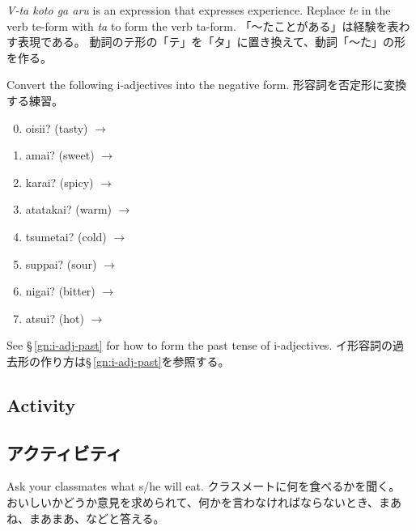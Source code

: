 \documentclass[uplatex,dvipdfmx,b5paper,english,10pt]{jsbook}
\begin{document}
\begin{toianswer}
\ifEnglish
{\it V-ta koto ga aru\/} is an expression that expresses experience.
Replace {\it te\/} in the verb te-form with {\it ta\/} to form the verb ta-form.
\else
「～たことがある」は経験を表わす表現である。
動詞のテ形の「テ」を「タ」に置き換えて、動詞「～た」の形を作る。
\fi
\end{toianswer}

\begin{toiquestion}
\ifEnglish
Convert the following i-adjectives into the negative form.
\else
形容詞を否定形に変換する練習。
\fi
\end{toiquestion}

\begin{multicols}{2}
 \begin{enumerate}
  \setcounter{enumi}{-1}
  \item oisii? (tasty)   $\rightarrow$ \hrulefill
  \item amai? (sweet)    $\rightarrow$ \hrulefill
  \item karai? (spicy)   $\rightarrow$ \hrulefill
  \item atatakai? (warm) $\rightarrow$ \hrulefill
  \item tsumetai? (cold) $\rightarrow$ \hrulefill
  \item suppai? (sour)   $\rightarrow$ \hrulefill
  \item nigai? (bitter)  $\rightarrow$ \hrulefill
  \item atsui? (hot)     $\rightarrow$ \hrulefill
 \end{enumerate}
\end{multicols}

\begin{toianswer}
\ifEnglish
See \S\,\ref{gn:i-adj-past} for how to form the past tense of i-adjectives.
\else
イ形容詞の過去形の作り方は\S\,\ref{gn:i-adj-past}を参照する。
\fi
\end{toianswer}

\ifEnglish
\subsection{Activity}
\else
\subsection{アクティビティ}
\fi

\begin{toiquestion}
\ifEnglish
Ask your classmates what s/he will eat.
\else
クラスメートに何を食べるかを聞く。
おいしいかどうか意見を求められて、何かを言わなければならないとき、まあね、まあまあ、などと答える。
\fi
\end{toiquestion}
\end{document}
